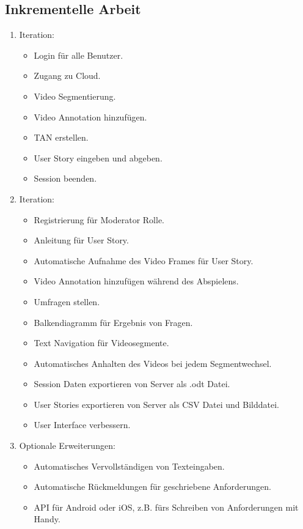 	\subsection{Inkrementelle Arbeit}
		\begin{enumerate}
			\item Iteration:
			\begin{itemize}
				\item Login für alle Benutzer.
				\item Zugang zu Cloud.
				\item Video Segmentierung.
				\item Video Annotation hinzufügen.
				\item TAN erstellen.
				\item User Story eingeben und abgeben.
				\item Session beenden.
			\end{itemize}
			\item Iteration:
			\begin{itemize}
				\item Registrierung für Moderator Rolle.
				\item Anleitung für User Story.
				\item Automatische Aufnahme des Video Frames für User Story.
				\item Video Annotation hinzufügen während des Abspielens.
				\item Umfragen stellen.
				\item Balkendiagramm für Ergebnis von Fragen.
				\item Text Navigation für Videosegmente.
				\item Automatisches Anhalten des Videos bei jedem Segmentwechsel.
				\item Session Daten exportieren von Server als .odt Datei.
				\item User Stories exportieren von Server als CSV Datei und Bilddatei.
				\item User Interface verbessern.
			\end{itemize}
			\item Optionale Erweiterungen:
			\begin{itemize}
				\item Automatisches Vervollständigen von Texteingaben.
				\item Automatische Rückmeldungen für geschriebene Anforderungen.
				\item API für Android oder iOS, z.B. fürs Schreiben von Anforderungen mit Handy.
			\end{itemize}
		\end{enumerate}


		